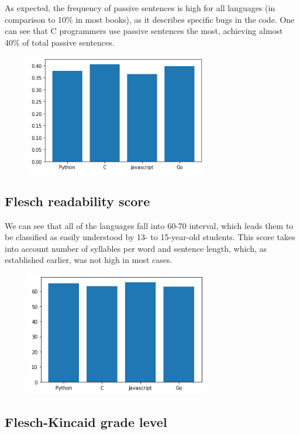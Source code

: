 \documentclass[]{article}
\begin{document}
As expected, the frequency of passive sentences is high for all languages (in comparison to 10\% in most books), as it describes specific bugs in the code. One can see that C programmers use passive sentences the most, achieving almost 40\% of total passive sentences.

\begin{figure}[H]
    \includegraphics[width=8cm]{passives.png}
    \centering
\end{figure}

\subsection{Flesch readability score}

We can see that all of the languages fall into 60-70 interval, which leads them to be classified as easily understood by 13- to 15-year-old students. This score takes into account number of syllables per word and sentence length, which, as established earlier, was not high in most cases.

\begin{figure}[H]
    \includegraphics[width=8cm]{flesch.png}
    \centering
\end{figure}

\subsection{Flesch-Kincaid grade level}
\end{document}
